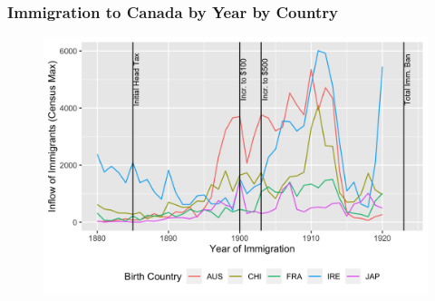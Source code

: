 \documentclass[pdf]{beamer}
\begin{document}
\begin{frame}[label = yrimmall]
	\frametitle{Immigration to Canada by Year by Country}
    \centering
	\begin{figure}[H]
		\begin{center}
			\includegraphics[width=\textwidth]{../../figs/yrimmall.png}
		\end{center}
	\end{figure}
\end{frame}
\end{document}

